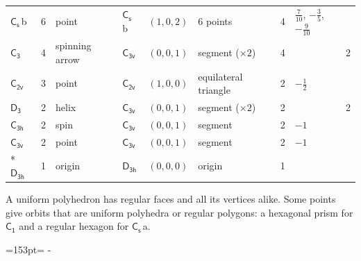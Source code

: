 \documentclass[10pt,a4paper]{article}
\newcommand{\needspace}[1]{\par\penalty-100\begingroup\dimen0=#1\relax\dimen2=\pagegoal
  \advance\dimen2-\pagetotal\ifdim\dimen0>\dimen2\relax\ifdim\dimen2>0pt\vfil\break\fi\fi
  \endgroup}
\numberwithin{equation}{section}
\newcommand{\grp}[1]{\mathsf{#1}}
\newcommand{\clsletter}[1]{\,{\scriptsize\color{black!55}#1}}
\newlength{\fillwidth}\newlength{\cellwidth}\newlength{\colwidth}
\begin{document}
{{\begin{longtable}{@{}lrllllr>{\RaggedRight\arraybackslash}p{\fillwidth}r@{}}
\href{C1v.pdf}{$\grp{C_{s}}$}\clsletter{b} & 6 & point & \href{C1v.pdf}{$\grp{C_{s}}$}\clsletter{b} & $(1, 0, 2)$ & 6 points & 4 & ${\tfrac{7}{10}}$, ${-\tfrac{3}{5}}$, ${-\tfrac{9}{10}}$ & \\
\href{C3.pdf}{$\grp{C_{3}}$} & 4 & spinning arrow & \href{C3v.pdf}{$\grp{C_{3v}}$} & $(0, 0, 1)$ & segment (${\times}2$) & 4 &  & 2\\
\href{C2v.pdf}{$\grp{C_{2v}}$} & 3 & point & \href{C2v.pdf}{$\grp{C_{2v}}$} & $(1, 0, 0)$ & equilateral triangle & 2 & ${-\tfrac{1}{2}}$ & \\
\href{D3.pdf}{$\grp{D_{3}}$} & 2 & helix & \href{C3v.pdf}{$\grp{C_{3v}}$} & $(0, 0, 1)$ & segment (${\times}2$) & 2 &  & 2\\
\href{C3h.pdf}{$\grp{C_{3h}}$} & 2 & spin & \href{C3v.pdf}{$\grp{C_{3v}}$} & $(0, 0, 1)$ & segment & 2 & ${-1}$ & \\
\href{C3v.pdf}{$\grp{C_{3v}}$} & 2 & point & \href{C3v.pdf}{$\grp{C_{3v}}$} & $(0, 0, 1)$ & segment & 2 & ${-1}$ & \\*
\href{D3h.pdf}{$\grp{D_{3h}}$} & 1 & origin & \href{D3h.pdf}{$\grp{D_{3h}}$} & $(0, 0, 0)$ & origin & 1 &  & \\
\bottomrule\end{longtable}}}
A uniform polyhedron has regular faces and all its vertices alike. Some points give orbits that are uniform polyhedra or regular polygons: a hexagonal prism for \href{C1.pdf}{$\grp{C_{1}}$} and a regular hexagon for \href{C1v.pdf}{$\grp{C_{s}}$}\clsletter{a}.
\needspace{153pt}
\end{document}
